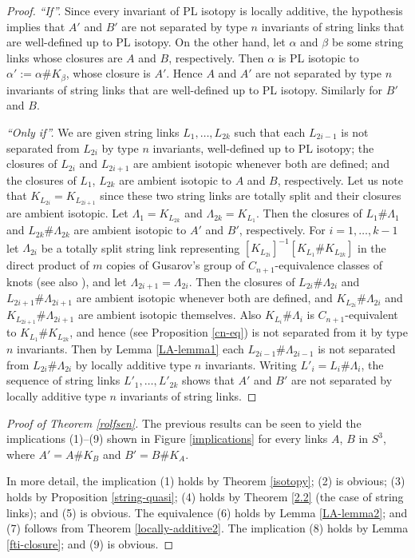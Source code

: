 \documentclass[a4paper,12pt,reqno,oneside]{amsart} %
\theoremstyle{plain}
\theoremstyle{definition}
\theoremstyle{named}
\renewcommand{\:}{\colon}
\begin{document}
\begin{proof} {\it ``If''.} Since every invariant of PL isotopy is locally additive, the hypothesis implies that
$A'$ and $B'$ are not separated by type $n$ invariants of string links that are well-defined up to PL isotopy.
On the other hand, let $\alpha$ and $\beta$ be some string links whose closures are $A$ and $B$, respectively.
Then $\alpha$ is PL isotopic to $\alpha':=\alpha\# K_\beta$, whose closure is $A'$.
Hence $A$ and $A'$ are not separated by type $n$ invariants of string links that are well-defined up to PL isotopy.
Similarly for $B'$ and $B$.

{\it ``Only if''.}
We are given string links $L_1,\dots,L_{2k}$ such that each $L_{2i-1}$ is not separated from $L_{2i}$
by type $n$ invariants, well-defined up to PL isotopy; the closures of $L_{2i}$ and $L_{2i+1}$ are ambient isotopic whenever both are defined; 
and the closures of $L_1$, $L_{2k}$ are ambient isotopic to $A$ and $B$, respectively.
Let us note that $K_{L_{2i}}=K_{L_{2i+1}}$ since these two string links are totally split and their closures are ambient isotopic.
Let $\Lambda_1=K_{L_{2k}}$ and $\Lambda_{2k}=K_{L_1}$.
Then the closures of $L_1\#\Lambda_1$ and $L_{2k}\#\Lambda_{2k}$ are ambient isotopic to $A'$ and $B'$, respectively.
For $i=1,\dots,k-1$ let $\Lambda_{2i}$ be a totally split string link representing $[K_{L_{2i}}]^{-1}[K_{L_1}\#K_{L_{2k}}]$
in the direct product of $m$ copies of Gusarov's group of $C_{n+1}$-equivalence classes of knots \cite{Gu1} (see also \cite{Hab}),
and let $\Lambda_{2i+1}=\Lambda_{2i}$.
Then the closures of $L_{2i}\#\Lambda_{2i}$ and $L_{2i+1}\#\Lambda_{2i+1}$ are ambient isotopic whenever both are defined,
and $K_{L_{2i}}\#\Lambda_{2i}$ and $K_{L_{2i+1}}\#\Lambda_{2i+1}$ are ambient isotopic themselves.
Also $K_{L_i}\#\Lambda_i$ is $C_{n+1}$-equivalent to $K_{L_1}\#K_{L_{2k}}$, and hence (see Proposition \ref{cn-eq})
is not separated from it by type $n$ invariants.
Then by Lemma \ref{LA-lemma1} each $L_{2i-1}\#\Lambda_{2i-1}$ is not separated from $L_{2i}\#\Lambda_{2i}$ by locally additive
type $n$ invariants.
Writing $L'_i=L_i\#\Lambda_i$, the sequence of string links $L'_1,\dots,L'_{2k}$ shows that $A'$ and $B'$ are not separated 
by locally additive type $n$ invariants of string links.
\end{proof}

\begin{proof}[Proof of Theorem \ref{rolfsen}] 
The previous results can be seen to yield the implications (1)--(9) shown in Figure \ref{implications} for every links $A$, $B$ in $S^3$,
where $A'=A\#K_B$ and $B'=B\#K_A$.

In more detail, the implication (1) holds by Theorem \ref{isotopy}; (2) is obvious; (3) holds by Proposition \ref{string-quasi};
(4) holds by Theorem \ref{2.2} (the case of string links); and (5) is obvious.
The equivalence (6) holds by Lemma \ref{LA-lemma2}; and (7) follows from Theorem \ref{locally-additive2}.
The implication (8) holds by Lemma \ref{fti-closure}; and (9) is obvious.
\end{proof}
\end{document}

